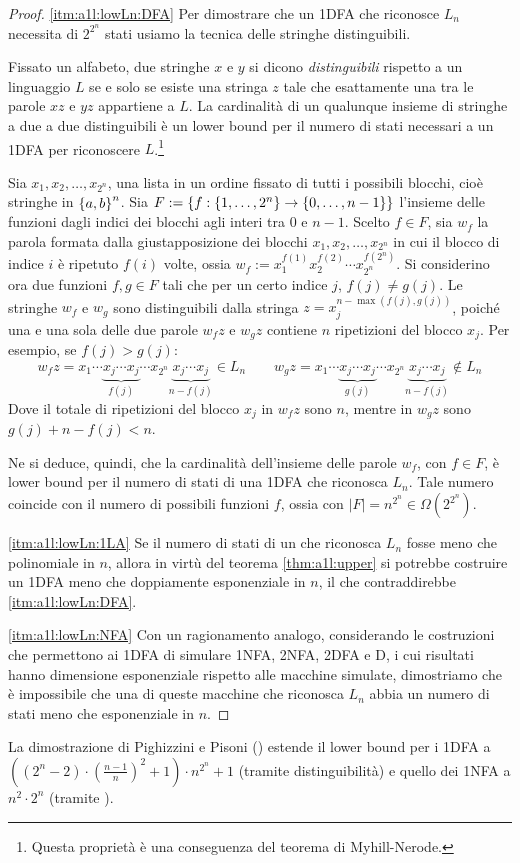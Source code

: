 \begin{proof}
	\ref{itm:a1l:lowLn:DFA} Per dimostrare che un 1DFA che riconosce $L_n$ necessita di $2^{2^n}$ stati usiamo la tecnica delle stringhe distinguibili.

	Fissato un alfabeto, due stringhe $x$ e $y$ si dicono \emph{distinguibili} rispetto a un linguaggio $L$ se e solo se esiste una stringa $z$ tale che esattamente una tra le parole $xz$ e $yz$ appartiene a $L$. La cardinalità di un qualunque insieme di stringhe a due a due distinguibili è un lower bound per il numero di stati necessari a un 1DFA per riconoscere $L$.\footnote{Questa proprietà è una conseguenza del teorema di Myhill-Nerode.}

	Sia $x_1,x_2,\dots,x_{2^n}$, una lista in un ordine fissato di tutti i possibili blocchi, cioè stringhe in $\left\{ a,b \right\}^n$. Sia $F:=\left\{ f: \left\{ 1,\dots,2^n \right\}\to\left\{ 0,\dots,n-1 \right\} \right\}$ l'insieme delle funzioni dagli indici dei blocchi agli interi tra $0$ e $n-1$. Scelto $f\in F$, sia $w_f$ la parola formata dalla giustapposizione dei blocchi $x_1,x_2,\dots,x_{2^n}$ in cui il blocco di indice $i$ è ripetuto $f(i)$ volte, ossia $w_f:=x_1^{f(1)}x_2^{f(2)}\cdots x_{2^n}^{f(2^n)}$. Si considerino ora due funzioni $f,g\in F$ tali che per un certo indice $j$, $f(j)\neq g(j)$. Le stringhe $w_f$ e $w_g$ sono distinguibili dalla stringa $z=x_j^{n-\max(f(j),g(j))}$, poiché una e una sola delle due parole $w_fz$ e $w_gz$ contiene $n$ ripetizioni del blocco $x_j$. Per esempio, se $f(j)>g(j)$:
	\begin{equation*}
		w_fz=x_1\cdots \underbrace{x_j\cdots x_j}_{f(j)} \cdots x_{2^n}\underbrace{x_j\cdots x_j}_{n-f(j)}\in L_n \qquad w_gz=x_1\cdots \underbrace{x_j\cdots x_j}_{g(j)} \cdots x_{2^n}\underbrace{x_j\cdots x_j}_{n-f(j)}\notin L_n
	\end{equation*}
	Dove il totale di ripetizioni del blocco $x_j$ in $w_fz$ sono $n$, mentre in $w_gz$ sono $g(j)+n-f(j)<n$.

	Ne si deduce, quindi, che la cardinalità dell'insieme delle parole $w_f$, con $f\in F$, è lower bound per il numero di stati di una 1DFA che riconosca $L_n$. Tale numero coincide con il numero di possibili funzioni $f$, ossia con $|F|=n^{2^n}\in\Omega(2^{2^n})$.

	\ref{itm:a1l:lowLn:1LA} Se il numero di stati di un  che riconosca $L_n$ fosse meno che polinomiale in $n$, allora in virtù del teorema \ref{thm:a1l:upper} si potrebbe costruire un 1DFA meno che doppiamente esponenziale in $n$, il che contraddirebbe \ref{itm:a1l:lowLn:DFA}.

	\ref{itm:a1l:lowLn:NFA} Con un ragionamento analogo, considerando le costruzioni che permettono ai 1DFA di simulare 1NFA, 2NFA, 2DFA e D, i cui risultati hanno dimensione esponenziale rispetto alle macchine simulate, dimostriamo che è impossibile che una di queste macchine che riconosca $L_n$ abbia un numero di stati meno che esponenziale in $n$.
\end{proof}
\noindent La dimostrazione di Pighizzini e Pisoni (\cite{Pighizzini:14:limitedRE}) estende il lower bound per i 1DFA a $((2^n-2)\cdot(\frac{n-1}{n})^2+1)\cdot n^{2^n}+1$ (tramite distinguibilità) e quello dei 1NFA a $n^2\cdot2^n$ (tramite ).

